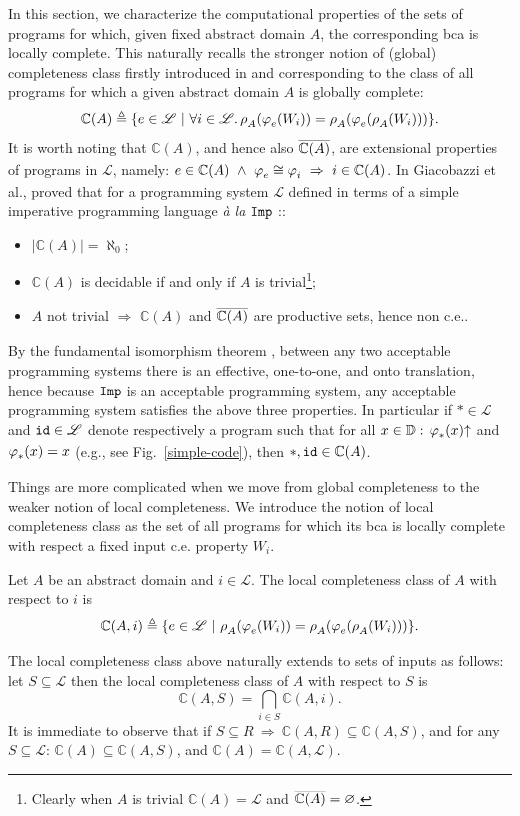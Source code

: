 \documentclass[runningheads]{llncs}
\def\ok#1{\mbox{\raisebox{0ex}[1ex][1ex]{$#1$}}}
\def\re{c.e.}
\def\Imp{\tt Imp}
\def\bbbc{{\mathbb{C}}}
\newcommand{\ccL}{\mathscr{L}}
\newcommand{\Domain}{\mathbb{D}}
\newcommand{\pfunction}[3]{\ok{\varphi^{#2\, #3}_{#1}}}
\newcommand{\auco}[2]{\ok{\rho^{#1}_{#2}}}
\newcommand{\compl}[1]{\ok{\overline{#1}}}
\def\defi{\triangleq}
\def\ok#1{\mbox{\raisebox{0ex}[1ex][1ex]{$#1$}}}
\def\cAA{\ensuremath{A}}
\newcommand{\sset}[2]{\{#1  ~|~ #2\}}
\begin{document}
In this section, we characterize the computational properties of the sets of programs
for which, given fixed abstract domain $\cAA$, the corresponding bca is locally complete. This naturally recalls the stronger notion of (global) completeness class firstly introduced in \cite{GiacobazziLR15} and corresponding to the class of all programs for which a given abstract domain $\cAA$ is globally complete: 
\[
\bbbc(\cAA) \defi \sset{e\in\ccL}{\forall i\in\ccL.\, 
\auco{}{A}(\pfunction{e}{}{}(W_i)) = \auco{}{A}(\pfunction{e}{}{}(\auco{}{A}(W_i)))}.
\]
It is worth noting that $\bbbc(\cAA)$, and hence also $\compl{\bbbc(\cAA)}$, are extensional properties of programs in $\ccL$, namely:
$e\in \bbbc(\cAA)~\wedge~\pfunction{e}{}{}\cong\pfunction{i}{}{}~\Rightarrow~i\in\bbbc(\cAA)$.
In \cite{GiacobazziLR15} Giacobazzi et al., proved that for a programming system $\ccL$ defined in terms of a simple imperative programming language {\em \`a la} $\Imp$ ::
\begin{itemize}
    \item $|\bbbc(\cAA)| = \aleph_0$;
    \item $\bbbc(\cAA)$ is decidable if and only if $A$ is trivial\footnote{Clearly when $A$ is trivial $\bbbc(\cAA)=\ccL$ and $\compl{\bbbc(\cAA)}=\varnothing$.};
    \item $A$ not trivial $\Rightarrow$ $\bbbc(\cAA)$ and $\compl{\bbbc(\cAA)}$ are productive sets, hence non {\re}.
\end{itemize}
By the fundamental isomorphism theorem \cite{Rogers58}, between any two acceptable programming systems there is an effective, one-to-one, and onto translation, hence because $\Imp$ is an acceptable programming system, any acceptable programming system satisfies the above three properties. In particular if $*\in\ccL$ and ${\tt id}\in\ccL$ denote respectively a program such that for all $x\in\Domain:\,\pfunction{*}{}{}(x){\uparrow}$ and $\pfunction{*}{}{}(x)=x$ (e.g., see Fig.~\ref{simple-code}), then $*,{\tt id}\in \bbbc(\cAA)$. 

Things are more complicated when we move from global completeness to the weaker notion of local completeness. 
We introduce the notion of local completeness class as the set of all programs for which its bca is locally complete with respect a fixed input {\re} property $W_i$.

\begin{definition}
    Let $\cAA$ be an abstract domain and $i\in \ccL$. The local completeness class of $\cAA$ with respect to $i$ is
    \[
\bbbc(\cAA,i) \defi \sset{e\in\ccL}{
\auco{}{A}(\pfunction{e}{}{}(W_i)) = \auco{}{A}(\pfunction{e}{}{}(\auco{}{A}(W_i)))}.
\]
\end{definition}
The local completeness class above naturally extends to sets of inputs as follows: let $S\subseteq\ccL$ then the local completeness class of $\cAA$ with respect to $S$ is
\[
\bbbc(\cAA,S)=\bigcap_{i\in S}\bbbc(\cAA,i).
\]
It is immediate to observe that if $S\subseteq R~\Rightarrow~\bbbc(\cAA,R)\subseteq\bbbc(\cAA,S)$, and for any $S\subseteq\ccL$: $\bbbc(\cAA)\subseteq\bbbc(\cAA,S)$, and $\bbbc(\cAA)=\bbbc(\cAA,\ccL)$.
\end{document}
